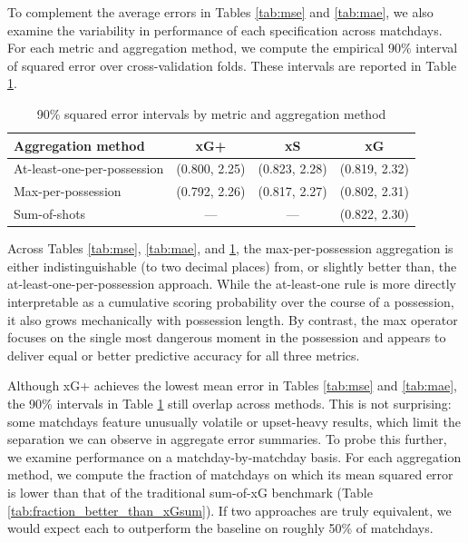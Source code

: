 \documentclass[12pt,letterpaper]{article}
\begin{document}
To complement the average errors in Tables \ref{tab:mse} and \ref{tab:mae}, we also examine the variability in performance of each specification across matchdays. For each metric and aggregation method, we compute the empirical 90\% interval of squared error over cross-validation folds. These intervals are reported in Table \ref{tab:sq_err_intervals}.


\begin{table}[ht]
\centering
\caption{90\% squared error intervals by metric and aggregation method}
\label{tab:sq_err_intervals}
\begin{tabular}{lccc}
\toprule
\textbf{Aggregation method} & \textbf{xG+} & \textbf{xS} & \textbf{xG} \\
\midrule
At-least-one-per-possession & (0.800, 2.25) & (0.823, 2.28) & (0.819, 2.32) \\
Max-per-possession          & (0.792, 2.26) & (0.817, 2.27) & (0.802, 2.31) \\
Sum-of-shots                & ---           & ---           & (0.822, 2.30) \\
\bottomrule
\end{tabular}
\end{table}


Across Tables \ref{tab:mse}, \ref{tab:mae}, and \ref{tab:sq_err_intervals}, the max-per-possession aggregation is either indistinguishable (to two decimal places) from, or slightly better than, the at-least-one-per-possession approach. While the at-least-one rule is more directly interpretable as a cumulative scoring probability over the course of a possession, it also grows mechanically with possession length. By contrast, the max operator focuses on the single most dangerous moment in the possession and appears to deliver equal or better predictive accuracy for all three metrics.

Although xG+ achieves the lowest mean error in Tables \ref{tab:mse} and \ref{tab:mae}, the 90\% intervals in Table \ref{tab:sq_err_intervals} still overlap across methods. This is not surprising: some matchdays feature unusually volatile or upset-heavy results, which limit the separation we can observe in aggregate error summaries. To probe this further, we examine performance on a matchday-by-matchday basis. For each aggregation method, we compute the fraction of matchdays on which its mean squared error is lower than that of the traditional sum-of-xG benchmark (Table \ref{tab:fraction_better_than_xGsum}). If two approaches are truly equivalent, we would expect each to outperform the baseline on roughly 50\% of matchdays.
\end{document}
